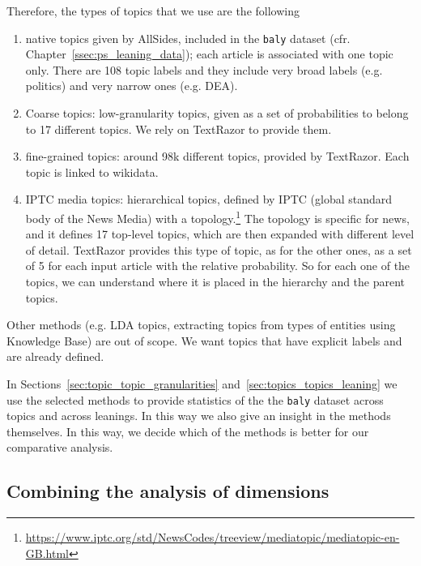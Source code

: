 Therefore, the types of topics that we use are the following

\begin{enumerate}
    \item native topics given by AllSides, included in the \texttt{baly} dataset (cfr. Chapter~\ref{ssec:ps_leaning_data}); each article is associated with one topic only. There are 108 topic labels and they include very broad labels (e.g. politics) and very narrow ones (e.g. DEA).
    \item Coarse topics: low-granularity topics, given as a set of probabilities to belong to 17 different topics. We rely on TextRazor to provide them.
    \item fine-grained topics: around 98k different topics, provided by TextRazor. Each topic is linked to wikidata.
    \item IPTC media topics: hierarchical topics, defined by IPTC (global standard body of the News Media) with a topology.\footnote{\url{https://www.iptc.org/std/NewsCodes/treeview/mediatopic/mediatopic-en-GB.html}}
    The topology is specific for news, and it defines 17 top-level topics, which are then expanded with different level of detail. TextRazor provides this type of topic, as for the other ones, as a set of 5 for each input article with the relative probability. So for each one of the topics, we can understand where it is placed in the hierarchy and the parent topics.
\end{enumerate}


Other methods (e.g. LDA topics, extracting topics from types of entities using Knowledge Base) are out of scope. We want topics that have explicit labels and are already defined.


In Sections~\ref{sec:topic_topic_granularities} and~\ref{sec:topics_topics_leaning} we use the selected methods to provide statistics of the the \texttt{baly} dataset across topics and across leanings. In this way we also give an insight in the methods themselves. In this way, we decide which of the methods is better for our comparative analysis.

\subsection{Combining the analysis of dimensions}
\label{sec:topic_method_combining}

